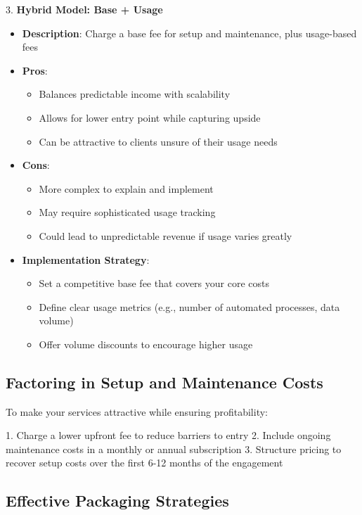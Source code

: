 3. \textbf{Hybrid Model: Base + Usage}
   \begin{itemize}
     \item \textbf{Description}: Charge a base fee for setup and maintenance, plus usage-based fees
     \item \textbf{Pros}:
       \begin{itemize}
         \item Balances predictable income with scalability
         \item Allows for lower entry point while capturing upside
         \item Can be attractive to clients unsure of their usage needs
       \end{itemize}
     \item \textbf{Cons}:
       \begin{itemize}
         \item More complex to explain and implement
         \item May require sophisticated usage tracking
         \item Could lead to unpredictable revenue if usage varies greatly
       \end{itemize}
     \item \textbf{Implementation Strategy}:
       \begin{itemize}
         \item Set a competitive base fee that covers your core costs
         \item Define clear usage metrics (e.g., number of automated processes, data volume)
         \item Offer volume discounts to encourage higher usage
       \end{itemize}
   \end{itemize}

\subsection{Factoring in Setup and Maintenance Costs}

To make your services attractive while ensuring profitability:

1. Charge a lower upfront fee to reduce barriers to entry
2. Include ongoing maintenance costs in a monthly or annual subscription
3. Structure pricing to recover setup costs over the first 6-12 months of the engagement

\subsection{Effective Packaging Strategies}

